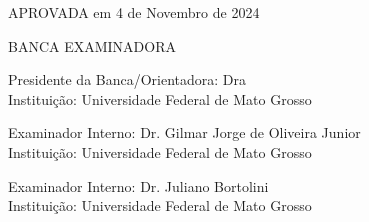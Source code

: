 \thispagestyle{empty}
\begin{center}\large
	\imprimirautor
\end{center}
\vspace*{0.2cm}


\begin{center}
	\imprimirtitulo
\end{center}
\vspace*{0.25cm}
\begin{flushright}
	\parbox[t]{9cm}{
	\SingleSpacing
	\imprimirpreambulo
	}
\end{flushright}



\vspace{0.5cm}
\begin{center}
	\noindent APROVADA em 4 de Novembro de 2024
\end{center}
\vspace{1.5cm}

\begin{center}
	BANCA EXAMINADORA
\end{center}
\vspace*{1cm}
\begin{center}
	\begin{minipage}[t]{10cm}
		\hrulefill
		\vspace*{-0.5cm}
		\begin{center}Presidente da Banca/Orientadora: Dra \imprimirorientador 
			\\
			Instituição: Universidade Federal de Mato Grosso\end{center}
		\vspace*{1cm}
		\hrulefill
		\vspace*{-0.5cm}
		\begin{center}Examinador Interno: Dr. Gilmar Jorge de Oliveira Junior\\
			Instituição: Universidade Federal de Mato Grosso\end{center}
		\vspace*{1cm}
		\hrulefill
		\vspace*{-0.5cm}
	\begin{center}Examinador Interno: Dr. Juliano Bortolini\\
	Instituição: Universidade Federal de Mato Grosso\end{center}
	\end{minipage}
\end{center}
\vfill

